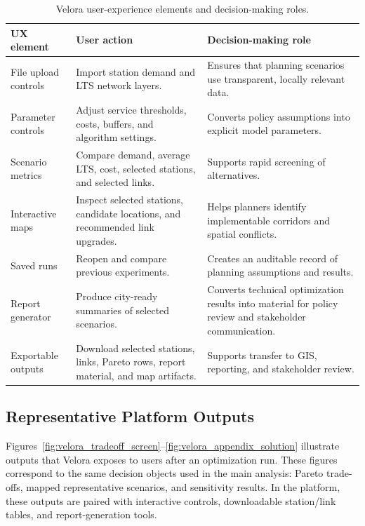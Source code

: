 \documentclass[preprint,authoryear,10pt]{elsarticle}
\begin{document}
\begin{table}[htbp]
  \centering
  \caption{Velora user-experience elements and decision-making roles.}
  \label{tab:velora_ux}
  \small
  \begin{tabularx}{0.95\textwidth}{@{} l X X @{}}
    \hline
    \textbf{UX element} & \textbf{User action} & \textbf{Decision-making role} \\
    \hline
    File upload controls & Import station demand and LTS network layers. & Ensures that planning scenarios use transparent, locally relevant data. \\
    Parameter controls & Adjust service thresholds, costs, buffers, and algorithm settings. & Converts policy assumptions into explicit model parameters. \\
    Scenario metrics & Compare demand, average LTS, cost, selected stations, and selected links. & Supports rapid screening of alternatives. \\
    Interactive maps & Inspect selected stations, candidate locations, and recommended link upgrades. & Helps planners identify implementable corridors and spatial conflicts. \\
    Saved runs & Reopen and compare previous experiments. & Creates an auditable record of planning assumptions and results. \\
    Report generator & Produce city-ready summaries of selected scenarios. & Converts technical optimization results into material for policy review and stakeholder communication. \\
    Exportable outputs & Download selected stations, links, Pareto rows, report material, and map artifacts. & Supports transfer to GIS, reporting, and stakeholder review. \\
    \hline
  \end{tabularx}
\end{table}

\subsection{Representative Platform Outputs}

Figures~\ref{fig:velora_tradeoff_screen}--\ref{fig:velora_appendix_solution} illustrate outputs that Velora exposes to users after an optimization run. These figures correspond to the same decision objects used in the main analysis: Pareto trade-offs, mapped representative scenarios, and sensitivity results. In the platform, these outputs are paired with interactive controls, downloadable station/link tables, and report-generation tools.
\end{document}
